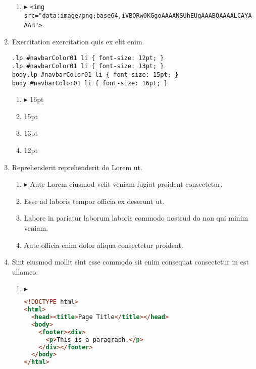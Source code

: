 \documentclass[a4paper,12pt]{article}
\begin{document}
\begin{enumerate}[label=\textbf{\arabic*.}]
\begin{enumerate}
		\item $\blacktriangleright$  \texttt{<img src="{}data:image/png;base64,iVBORw0KGgoAAAANSUhEUgAAABQAAAALCAYAAAB"{}>}.
    
	\end{enumerate}

\item Exercitation exercitation quis ex elit enim.
  
  \begin{minipage}{\textwidth} %
  \begin{lstlisting}
.lp #navbarColor01 li { font-size: 12pt; }
.lp #navbarColor01 li { font-size: 13pt; }
body.lp #navbarColor01 li { font-size: 15pt; }
body #navbarColor01 li { font-size: 16pt; }
  \end{lstlisting}
  \end{minipage}
\begin{multicols}{2}
	\begin{enumerate}
		\item $\blacktriangleright$  16pt
  
		\item  15pt
    
		\item  13pt
    
		\item  12pt
    
	\end{enumerate}

\end{multicols}
\item Reprehenderit reprehenderit do Lorem ut.
\begin{multicols}{2}
	\begin{enumerate}
		\item $\blacktriangleright$  Aute Lorem eiusmod velit veniam fugiat proident consectetur.
  
		\item  Esse ad laboris tempor officia ex deserunt ut.
    
		\item  Labore in pariatur laborum laboris commodo nostrud do non qui minim veniam.
    
		\item  Aute officia enim dolor aliqua consectetur proident.
    
	\end{enumerate}

\end{multicols}
\item Sint eiusmod mollit sint esse commodo sit enim consequat consectetur in est ullamco.
	\begin{enumerate}
		\item $\blacktriangleright$  \hfill \vspace*{-7mm}
    \begin{lstlisting}[language=HTML]
<!DOCTYPE html>
<html>
  <head><title>Page Title</title></head>
  <body>
    <footer><div>
      <p>This is a paragraph.</p>
    </div></footer>
  </body>
</html>
    \end{lstlisting}
  

\end{enumerate}
\end{enumerate}
\end{document}
